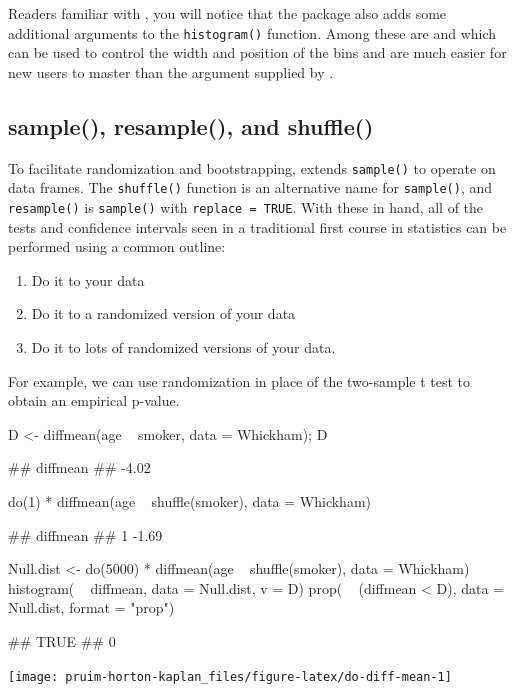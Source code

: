 \noindent
Readers familiar with , you will notice that the
 package also adds some additional arguments to the
\texttt{histogram()} function. Among these are  and
 which can be used to control the width and position of the
bins and are much easier for new users to master than the 
argument supplied by .

\subsection{sample(), resample(), and
shuffle()}\label{sample-resample-and-shuffle}

To facilitate randomization and bootstrapping,  extends
\texttt{sample()} to operate on data frames. The \texttt{shuffle()}
function is an alternative name for \texttt{sample()}, and
\texttt{resample()} is \texttt{sample()} with \texttt{replace\ =\ TRUE}.
With these in hand, all of the tests and confidence intervals seen in a
traditional first course in statistics can be performed using a common
outline:

\begin{enumerate}
\def\labelenumi{\arabic{enumi}.}
\tightlist
\item
  Do it to your data
\item
  Do it to a randomized version of your data
\item
  Do it to lots of randomized versions of your data.
\end{enumerate}

For example, we can use randomization in place of the two-sample t test
to obtain an empirical p-value.

\begin{Schunk}
\begin{Sinput}
D <- diffmean(age ~ smoker, data = Whickham); D 
\end{Sinput}
\begin{Soutput}
## diffmean 
##    -4.02
\end{Soutput}
\begin{Sinput}
do(1) * diffmean(age ~ shuffle(smoker), data = Whickham)
\end{Sinput}
\begin{Soutput}
##   diffmean
## 1    -1.69
\end{Soutput}
\begin{Sinput}
Null.dist <- do(5000) * diffmean(age ~ shuffle(smoker), data = Whickham)
histogram( ~ diffmean, data = Null.dist, v = D)
prop( ~ (diffmean < D), data = Null.dist, format = "prop")
\end{Sinput}
\begin{Soutput}
## TRUE 
##    0
\end{Soutput}


\begin{center}\texttt{[image: pruim-horton-kaplan\_files/figure-latex/do-diff-mean-1]} \end{center}

\end{Schunk}

